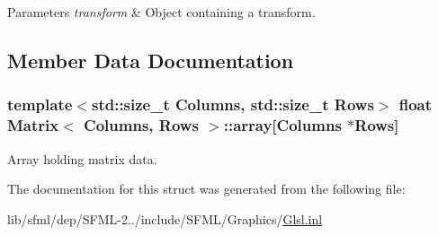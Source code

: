 \begin{DoxyParams}{Parameters}
{\em transform} & Object containing a transform. \\
\hline
\end{DoxyParams}


\subsection{Member Data Documentation}
\hypertarget{struct_matrix_a494cc3a7a34398ec21992ba83018d9f4}{
\subsubsection[{array}]{\setlength{\rightskip}{0pt plus 5cm}template$<$std\-::size\-\_\-t Columns, std\-::size\-\_\-t Rows$>$ float {\bf Matrix}$<$ Columns, Rows $>$\-::array\mbox{[}Columns $\ast$Rows\mbox{]}}}\label{struct_matrix_a494cc3a7a34398ec21992ba83018d9f4}


Array holding matrix data. 



The documentation for this struct was generated from the following file\-:\begin{DoxyCompactItemize}
\item 
lib/sfml/dep/\-S\-F\-M\-L-\/2../include/\-S\-F\-M\-L/\-Graphics/\hyperlink{_glsl_8inl}{Glsl.\-inl}\end{DoxyCompactItemize}
